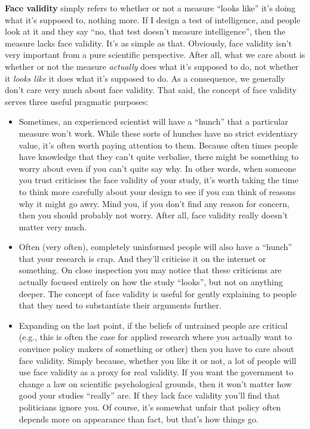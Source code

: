 \documentclass[
  a4paper,
]{book}
\providecommand{\tightlist}{%
  \setlength{\itemsep}{0pt}\setlength{\parskip}{0pt}}\usepackage{longtable,booktabs,array}
\begin{document}
\textbf{Face validity} simply refers to whether or not a measure ``looks
like'' it's doing what it's supposed to, nothing more. If I design a
test of intelligence, and people look at it and they say ``no, that test
doesn't measure intelligence'', then the measure lacks face validity.
It's as simple as that. Obviously, face validity isn't very important
from a pure scientific perspective. After all, what we care about is
whether or not the measure \emph{actually} does what it's supposed to
do, not whether it \emph{looks like} it does what it's supposed to do.
As a consequence, we generally don't care very much about face validity.
That said, the concept of face validity serves three useful pragmatic
purposes:

\begin{itemize}
\tightlist
\item
  Sometimes, an experienced scientist will have a ``hunch'' that a
  particular measure won't work. While these sorts of hunches have no
  strict evidentiary value, it's often worth paying attention to them.
  Because often times people have knowledge that they can't quite
  verbalise, there might be something to worry about even if you can't
  quite say why. In other words, when someone you trust criticises the
  face validity of your study, it's worth taking the time to think more
  carefully about your design to see if you can think of reasons why it
  might go awry. Mind you, if you don't find any reason for concern,
  then you should probably not worry. After all, face validity really
  doesn't matter very much.
\item
  Often (very often), completely uninformed people will also have a
  ``hunch'' that your research is crap. And they'll criticise it on the
  internet or something. On close inspection you may notice that these
  criticisms are actually focused entirely on how the study ``looks'',
  but not on anything deeper. The concept of face validity is useful for
  gently explaining to people that they need to substantiate their
  arguments further.
\item
  Expanding on the last point, if the beliefs of untrained people are
  critical (e.g., this is often the case for applied research where you
  actually want to convince policy makers of something or other) then
  you have to care about face validity. Simply because, whether you like
  it or not, a lot of people will use face validity as a proxy for real
  validity. If you want the government to change a law on scientific
  psychological grounds, then it won't matter how good your studies
  ``really'' are. If they lack face validity you'll find that
  politicians ignore you. Of course, it's somewhat unfair that policy
  often depends more on appearance than fact, but that's how things go.
\end{itemize}
\end{document}
